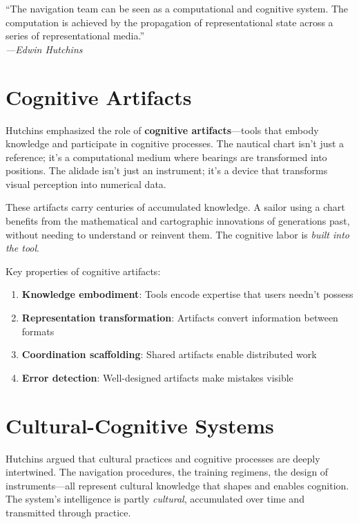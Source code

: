 \begin{quotebox}
``The navigation team can be seen as a computational and cognitive system. The computation is achieved by the propagation of representational state across a series of representational media.''\\
\emph{---Edwin Hutchins}
\end{quotebox}

\section{Cognitive Artifacts}

Hutchins emphasized the role of \textbf{cognitive artifacts}---tools that embody knowledge and participate in cognitive processes. The nautical chart isn't just a reference; it's a computational medium where bearings are transformed into positions. The alidade isn't just an instrument; it's a device that transforms visual perception into numerical data.

These artifacts carry centuries of accumulated knowledge. A sailor using a chart benefits from the mathematical and cartographic innovations of generations past, without needing to understand or reinvent them. The cognitive labor is \emph{built into the tool}.

Key properties of cognitive artifacts:

\begin{enumerate}
    \item \textbf{Knowledge embodiment}: Tools encode expertise that users needn't possess
    \item \textbf{Representation transformation}: Artifacts convert information between formats
    \item \textbf{Coordination scaffolding}: Shared artifacts enable distributed work
    \item \textbf{Error detection}: Well-designed artifacts make mistakes visible
\end{enumerate}

\section{Cultural-Cognitive Systems}

Hutchins argued that cultural practices and cognitive processes are deeply intertwined. The navigation procedures, the training regimens, the design of instruments---all represent cultural knowledge that shapes and enables cognition. The system's intelligence is partly \emph{cultural}, accumulated over time and transmitted through practice.

